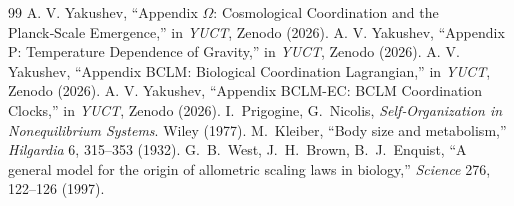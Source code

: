 \documentclass[11pt,a4paper]{article}
\begin{document}
\begin{thebibliography}{99}
		 A. V. Yakushev, ``Appendix $\Omega$: Cosmological Coordination and the Planck‑Scale Emergence,'' in \emph{YUCT}, Zenodo (2026).
		 A. V. Yakushev, ``Appendix P: Temperature Dependence of Gravity,'' in \emph{YUCT}, Zenodo (2026).
		 A. V. Yakushev, ``Appendix BCLM: Biological Coordination Lagrangian,'' in \emph{YUCT}, Zenodo (2026).
		 A. V. Yakushev, ``Appendix BCLM-EC: BCLM Coordination Clocks,'' in \emph{YUCT}, Zenodo (2026).
		 I.~Prigogine, G.~Nicolis, \emph{Self‑Organization in Nonequilibrium Systems}. Wiley (1977).
		 M.~Kleiber, ``Body size and metabolism,'' \emph{Hilgardia} 6, 315–353 (1932).
		 G.~B.~West, J.~H.~Brown, B.~J.~Enquist, ``A general model for the origin of allometric scaling laws in biology,'' \emph{Science} 276, 122–126 (1997).
	\end{thebibliography}
	
\end{document}
